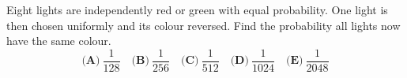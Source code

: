 Eight lights are independently red or green with equal probability. One light is then chosen uniformly and its colour reversed. Find the probability all lights now have the same colour.
\[\textbf{(A)}~\dfrac{1}{128}\quad\textbf{(B)}~\dfrac{1}{256}\quad\textbf{(C)}~\dfrac{1}{512}\quad\textbf{(D)}~\dfrac{1}{1024}\quad\textbf{(E)}~\dfrac{1}{2048}\]
